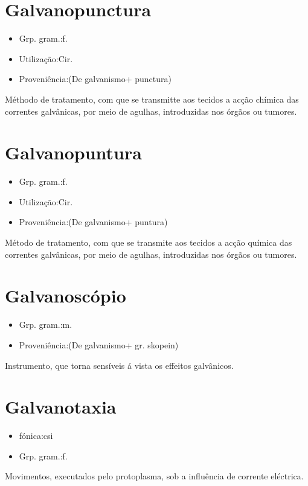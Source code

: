 \section{Galvanopunctura}
\begin{itemize}
\item {Grp. gram.:f.}
\end{itemize}
\begin{itemize}
\item {Utilização:Cir.}
\end{itemize}
\begin{itemize}
\item {Proveniência:(De \textunderscore galvanismo\textunderscore  + \textunderscore punctura\textunderscore )}
\end{itemize}
Méthodo de tratamento, com que se transmitte aos tecidos a acção chímica das correntes galvânicas, por meio de agulhas, introduzidas nos órgãos ou tumores.
\section{Galvanopuntura}
\begin{itemize}
\item {Grp. gram.:f.}
\end{itemize}
\begin{itemize}
\item {Utilização:Cir.}
\end{itemize}
\begin{itemize}
\item {Proveniência:(De \textunderscore galvanismo\textunderscore  + \textunderscore puntura\textunderscore )}
\end{itemize}
Método de tratamento, com que se transmite aos tecidos a acção química das correntes galvânicas, por meio de agulhas, introduzidas nos órgãos ou tumores.
\section{Galvanoscópio}
\begin{itemize}
\item {Grp. gram.:m.}
\end{itemize}
\begin{itemize}
\item {Proveniência:(De \textunderscore galvanismo\textunderscore  + gr. \textunderscore skopein\textunderscore )}
\end{itemize}
Instrumento, que torna sensíveis á vista os effeitos galvânicos.
\section{Galvanotaxia}
\begin{itemize}
\item {fónica:csi}
\end{itemize}
\begin{itemize}
\item {Grp. gram.:f.}
\end{itemize}
Movimentos, executados pelo protoplasma, sob a influência de corrente eléctrica.
